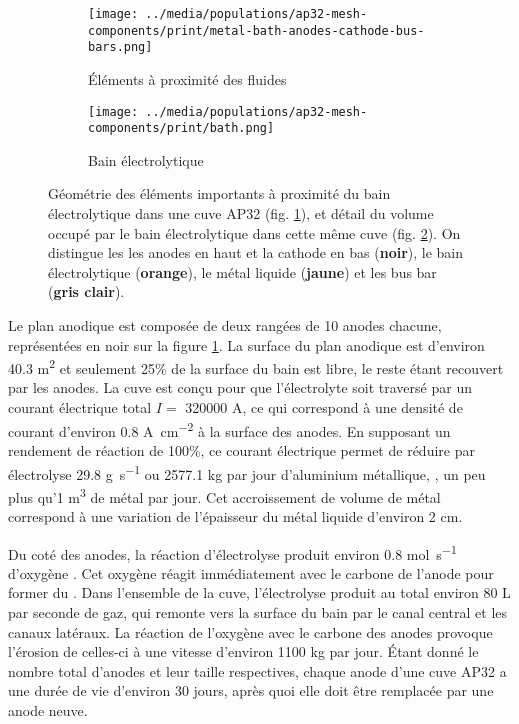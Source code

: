 \begin{figure}[t]
  \begin{center}
    \begin{subfigure}[b]{0.49\textwidth}
      \texttt{[image: ../media/populations/ap32-mesh-components/print/metal-bath-anodes-cathode-bus-bars.png]}
      \caption{Éléments à proximité des fluides}
      \label{fig:ap32-geometry-elements}
    \end{subfigure}

    \begin{subfigure}[b]{0.49\textwidth}
      \texttt{[image: ../media/populations/ap32-mesh-components/print/bath.png]}
      \caption{Bain électrolytique}
      \label{fig:ap32-geometry-electrolyte}
    \end{subfigure}

    \caption{Géométrie des éléments importants à proximité
      du bain électrolytique dans une cuve AP32
      (fig. \ref{fig:ap32-geometry-elements}), et détail du volume
      occupé par le bain électrolytique dans cette même cuve
      (fig. \ref{fig:ap32-geometry-electrolyte}). On distingue les
      les anodes en haut et la cathode
      en bas (\textbf{noir}), le bain électrolytique
      (\textbf{orange}), le métal liquide (\textbf{jaune}) et les
      bus bar (\textbf{gris clair}).}
    \label{fig:ap32-geometry}
  \end{center}
\end{figure}

Le plan anodique est composée de deux rangées de 10 anodes chacune,
représentées en noir sur la figure \ref{fig:ap32-geometry-elements}. La
surface du plan anodique est d'environ \num{40.3} \si{\square\meter}
et seulement \num{25}\% de la surface du bain est libre, le reste
étant recouvert par les anodes. La cuve est conçu pour que
l'électrolyte soit traversé par un courant électrique total $I = $
\num{320000} \si{\ampere}, ce qui correspond à une densité de courant
d'environ \num{0.8} \si{\ampere\per\square\centi\meter} à la surface
des anodes. En supposant un rendement de réaction de \num{100}\%, ce
courant électrique permet de réduire par électrolyse \num{29.8}
\si{\gram\per\second} ou \num{2577.1} \si{\kilo\gram} par jour
d'aluminium métallique, \ie, un peu plus qu'\num{1} \si{\cubic\meter}
de métal par jour. Cet accroissement de volume de métal correspond à
une variation de l'épaisseur du métal liquide d'environ \num{2}
\si{\centi\meter}.

Du coté des anodes, la réaction d'électrolyse produit environ
\num{0.8} \si{\mol\per\second} d'oxygène . Cet oxygène réagit
immédiatement avec le carbone de l'anode pour former du . Dans
l'ensemble de la cuve, l'électrolyse produit au total environ \num{80}
\si{\liter} par seconde de gaz, qui remonte vers la surface du bain
par le canal central et les canaux latéraux. La réaction de l'oxygène
avec le carbone des anodes provoque l'érosion de celles-ci à une
vitesse d'environ \num{1100} \si{\kilo\gram} par jour. Étant donné le
nombre total d'anodes et leur taille respectives, chaque anode d'une
cuve AP32 a une durée de vie d'environ 30 jours, après quoi elle doit
être remplacée par une anode neuve.

